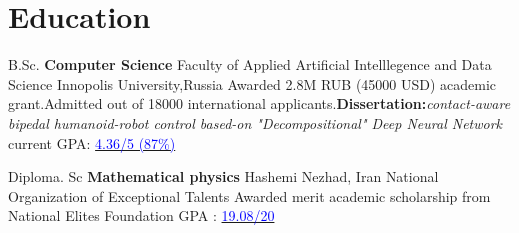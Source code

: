 \section{Education}
            {B.Sc. \textbf{Computer Science}}
            {Faculty of Applied Artificial Intelllegence and Data Science}
            {Innopolis University,Russia}
            {Awarded 2.8M RUB (45000 USD) academic grant.Admitted out of 18000 international applicants.\textbf{Dissertation:}\textit{contact-aware bipedal humanoid-robot control based-on "Decompositional" Deep Neural Network} }
            {current GPA: \href{https://drive.google.com/file/d/1oK1n1Cq0bO4Zk1kgftOBm5El64YeNCGk/view?usp=sharing}{\textcolor{blue}{4.36/5 (87\%)}} }
  
    \vspace{10pt}
    
            {Diploma. Sc \textbf{Mathematical physics}}
            {Hashemi Nezhad, Iran}
            {National Organization of Exceptional Talents}
            {Awarded merit academic scholarship from National Elites Foundation }
            {GPA : \href{https://drive.google.com/file/d/1N0k_16lOQtVe9FI5MGIu6QGJ8eLOUbus/view?usp=sharing}{\textcolor{blue}{19.08/20}}}